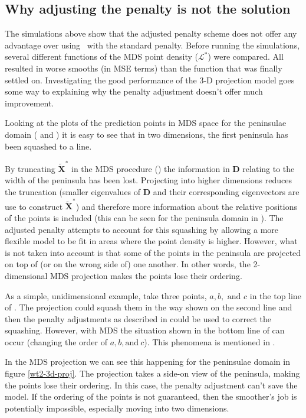 \subsection{Why adjusting the penalty is not the solution}
\label{pensuck}

The simulations above show that the adjusted penalty scheme does not offer any advantage over using \mdsap\ with the standard penalty. Before running the simulations, several different functions of the MDS point density ($\mathcal{L}^*$) were compared. All resulted in worse smooths (in MSE terms) than the function that was finally settled on. Investigating the good performance of the 3-D projection model goes some way to explaining why the penalty adjustment doesn't offer much improvement.

Looking at the plots of the prediction points in MDS space for the peninsulae domain ( and ) it is easy to see that in two dimensions, the first peninsula has been squashed to a line. 

By truncating $\tilde{\mathbf{X}}^*$ in the MDS procedure () the information in $\mathbf{D}$ relating to the width of the peninsula has been lost. Projecting into higher dimensions reduces the truncation (smaller eigenvalues of $\mathbf{D}$ and their corresponding eigenvectors are use to construct $\tilde{\mathbf{X}}^*$) and therefore more information about the relative positions of the points is included (this can be seen for the peninsula domain in ). The adjusted penalty attempts to account for this squashing by allowing a more flexible model to be fit in areas where the point density is higher. However, what is not taken into account is that some of the points in the peninsula are projected on top of (or on the wrong side of) one another. In other words, the 2-dimensional MDS projection makes the points lose their ordering. 

As a simple, unidimensional example, take three points, $a, b, \text{ and } c$ in the top line of . The projection could squash them in the way shown on the second line and then the penalty adjustments as described in  could be used to correct the squashing. However, with MDS the situation shown in the bottom line of  can occur (changing the order of $a, b, \text{and}\ c$). This phenomena is mentioned in .

In the MDS projection we can see this happening for the peninsulae domain in figure \ref{wt2-3d-proj}. The projection takes a side-on view of the peninsula, making the points lose their ordering. In this case, the penalty adjustment can't save the model. If the ordering of the points is not guaranteed, then the smoother's job is potentially impossible, especially moving into two dimensions.

